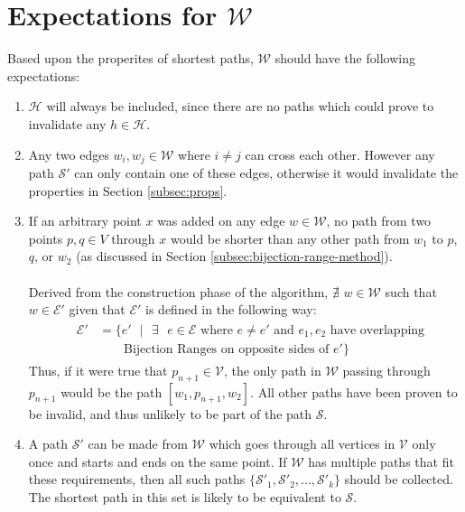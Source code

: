 \documentclass[12pt]{article}
\begin{document}
\section{Expectations for $\mathcal{W}$}\label{subsec:expW}
Based upon the properites of shortest paths, $\mathcal{W}$ should have the
following expectations:
\begin{enumerate}
\item $\mathcal{H}$ will always be included, since there are no paths
which could prove to invalidate any $h \in \mathcal{H}$.
\item Any two edges $w_i,w_j \in \mathcal{W}$ where $i \neq j$ can cross each other.
However any path $\mathcal{S}'$ can only contain one of these edges,
otherwise it would invalidate the properties in Section \ref{subsec:props}.
\item If an arbitrary point $x$ was added on any edge $w \in \mathcal{W}$,
no path from two points $p,q \in V$ through $x$ would be shorter than any other
path from $w_1$ to $p$, $q$, or $w_2$ (as discussed in Section
\ref{subsec:bijection-range-method}).
\\\\
Derived from the construction phase of the algorithm,
$\nexists$ $w \in \mathcal{W}$ such that $w \in \mathcal{E}'$
given that $\mathcal{E}'$ is defined in the following way:
\begin{align*}
&\begin{aligned}
\mathcal{E}' &= \{e'\text{ }|\text{ }\exists\text{ }e \in \mathcal{E} \text{ where } e \neq e'
\text{ and } e_1,e_2 \text{ have overlapping}\\
&\qquad \text{Bijection Ranges on opposite sides of } e'\}
\end{aligned}
\end{align*}
Thus, if it were true that $p_{n+1} \in \mathcal{V}$,
the only path in $\mathcal{W}$ passing
through $p_{n + 1}$ would be the path $[w_1,p_{n+1},w_2]$.
All other paths have been proven to be invalid,
and thus unlikely to be part of the path $\mathcal{S}$.
\item A path $\mathcal{S}'$ can be made from $\mathcal{W}$
which goes through all vertices in $\mathcal{V}$ only once
and starts and ends on the same point.
If $\mathcal{W}$ has multiple paths that fit these requirements, then all such paths
$\{\mathcal{S}'_1, \mathcal{S}'_2, ..., \mathcal{S}'_k\}$ should be collected.
The shortest path in this set is likely to be equivalent to $\mathcal{S}$.
\end{enumerate}
\end{document}
